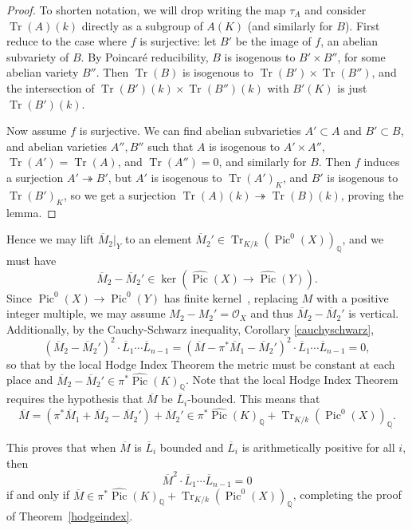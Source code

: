 \documentclass[times, doublespace]{amsart}
\numberwithin{equation}{section}
\theoremstyle{plain}
\theoremstyle{definition}
\DeclareMathOperator{\Pic}{Pic}
\newcommand{\Tr}{\operatorname{Tr}}
\newcommand{\imP}[1]{\Tr_{K/k}\left(\Pic^0(#1)\right)}
\newcommand{\Q}{\mathbb{Q}}
\begin{document}
 
 \begin{proof}
 To shorten notation, we will drop writing the map $\tau_A$ and consider $\Tr(A)(k)$ directly as a subgroup of $A(K)$ (and similarly for $B$).
 First reduce to the case where $f$ is surjective: let $B'$ be the image of $f$, an abelian subvariety of $B$. By Poincar\'e reducibility, $B$ is isogenous to $B'\times B''$, for some abelian variety $B''$. Then $\Tr(B)$ is isogenous to $\Tr(B')\times \Tr(B'')$, and the intersection of $\Tr(B')(k)\times \Tr(B'')(k)$ with $B'(K)$ is just $\Tr(B')(k)$. 
 
 Now assume $f$ is surjective. We can find abelian subvarieties $A'\subset A$ and $B'\subset B$, and abelian varieties $A'',B''$ such that $A$ is isogenous to $A'\times A''$, $\Tr(A')=\Tr(A)$, and $\Tr(A'')=0$, and similarly for $B$. Then $f$ induces a surjection $A'\twoheadrightarrow B'$, but $A'$ is isogenous to $\Tr(A')_K$, and $B'$ is isogenous to $\Tr(B')_K$, so we get a surjection $\Tr(A)(k)\twoheadrightarrow\Tr(B)(k)$, proving the lemma.
\end{proof}


Hence we may lift $\overline M_2|_Y$ to an element $\overline M_2'\in \imP{X}_{\Q}$,
 and we must have 
\[\overline M_2-\overline M_2'\in\ker\left(\widehat{\Pic}(X)\longrightarrow\widehat{\Pic}(Y)\right).\]
Since $\Pic^0(X)\to\Pic^0(Y)$ has finite kernel~\cite[Remark 9.5.8]{Kleiman}, replacing $M$ with a positive integer multiple, we may assume $M_2-M_2'=\mathcal O_X$ and thus $\overline M_2-\overline M_2'$ is vertical. Additionally, by the Cauchy-Schwarz inequality, Corollary \ref{cauchyschwarz},
\[\left(\overline M_2-\overline M_2'\right)^2\cdot \overline L_1\cdots \overline L_{n-1}=\left(\overline M-\pi^*\overline M_1-\overline M_2'\right)^2\cdot \overline L_1\cdots \overline L_{n-1}=0,\]
so that by the local Hodge Index Theorem the metric must be constant at each place and $\overline M_2-\overline M_2'\in\pi^*\widehat{\Pic}(K)_{\Q}$. Note that the local Hodge Index Theorem requires the hypothesis that $\overline M$ be $\overline L_i$-bounded. This means that 
\[\overline M=\left(\pi^*\overline M_1+\overline M_2-\overline M_2'\right)+\overline M_2'\in\pi^*\widehat{\Pic}(K)_{\Q}+\imP{X}_{\Q}.\]

This proves that when $\overline M$ is $\overline L_i$ bounded and $\overline L_i$ is arithmetically positive for all $i$, then 
\[\overline{M}^2\cdot\overline{L}_{1}\cdots\overline{L}_{n-1}=0\]
if and only if $\overline M\in\pi^*\widehat{\Pic}(K)_{\Q}+\imP{X}_{\Q}$, completing the proof of Theorem~\ref{hodgeindex}.
\end{document}
